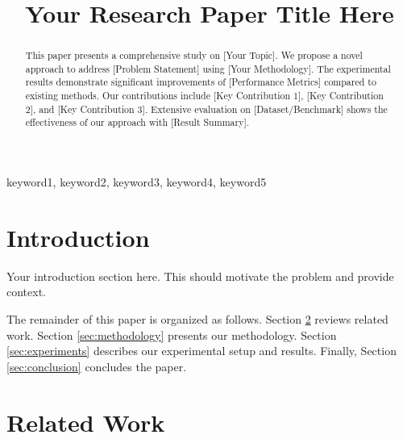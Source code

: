\documentclass[conference]{IEEEtran}
\begin{document}
\title{Your Research Paper Title Here}

\author{
}

\maketitle

\begin{abstract}
This paper presents a comprehensive study on [Your Topic]. We propose a novel approach to address [Problem Statement] using [Your Methodology]. The experimental results demonstrate significant improvements of [Performance Metrics] compared to existing methods. Our contributions include [Key Contribution 1], [Key Contribution 2], and [Key Contribution 3]. Extensive evaluation on [Dataset/Benchmark] shows the effectiveness of our approach with [Result Summary].
\end{abstract}

\begin{IEEEkeywords}
keyword1, keyword2, keyword3, keyword4, keyword5
\end{IEEEkeywords}

\section{Introduction}
\label{sec:introduction}

Your introduction section here. This should motivate the problem and provide context.

The remainder of this paper is organized as follows. Section \ref{sec:related} reviews related work. Section \ref{sec:methodology} presents our methodology. Section \ref{sec:experiments} describes our experimental setup and results. Finally, Section \ref{sec:conclusion} concludes the paper.

\section{Related Work}
\label{sec:related}
\end{document}
